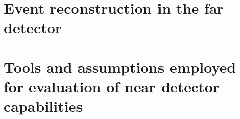 \section{Event reconstruction in the far detector}
\label{sec:tools-fdreco}


\section{Tools and assumptions employed for evaluation of near detector capabilities}
\label{sec:tools-nd-eval}



